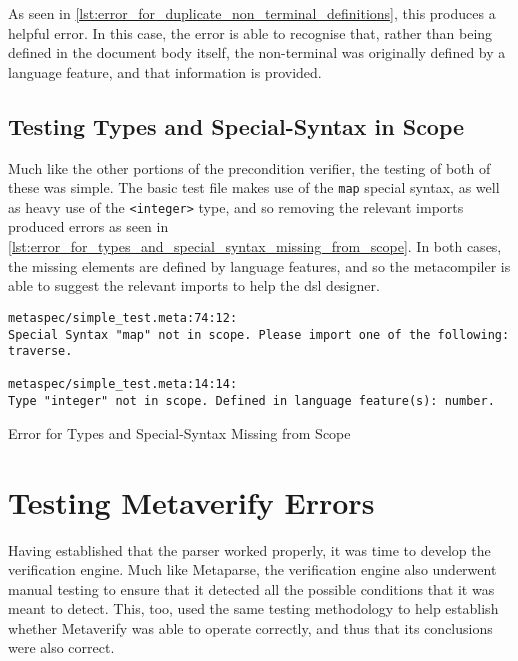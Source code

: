 As seen in \autoref{lst:error_for_duplicate_non_terminal_definitions}, this produces a helpful error. 
In this case, the error is able to recognise that, rather than being defined in the document body itself, the non-terminal was originally defined by a language feature, and that information is provided. 


\subsection{Testing Types and Special-Syntax in Scope} %
\label{sub:testing_types_and_special_syntax_in_scope}
Much like the other portions of the precondition verifier, the testing of both of these was simple. 
The basic test file makes use of the \texttt{map} special syntax, as well as heavy use of the \texttt{<integer>} type, and so removing the relevant imports produced errors as seen in \autoref{lst:error_for_types_and_special_syntax_missing_from_scope}.
In both cases, the missing elements are defined by language features, and so the metacompiler is able to suggest the relevant imports to help the \gls{dsl} designer. 

\begin{listing}[!htb]
\begin{verbatim}
metaspec/simple_test.meta:74:12:
Special Syntax "map" not in scope. Please import one of the following: traverse.

metaspec/simple_test.meta:14:14:
Type "integer" not in scope. Defined in language feature(s): number.
\end{verbatim}
\caption{Error for Types and Special-Syntax Missing from Scope}
\label{lst:error_for_types_and_special_syntax_missing_from_scope}
\end{listing}




\section{Testing Metaverify Errors} %
\label{sec:testing_metaverify_errors}
Having established that the parser worked properly, it was time to develop the verification engine. 
Much like Metaparse, the verification engine also underwent manual testing to ensure that it detected all the possible conditions that it was meant to detect. 
This, too, used the same testing methodology to help establish whether Metaverify was able to operate correctly, and thus that its conclusions were also correct.\\

